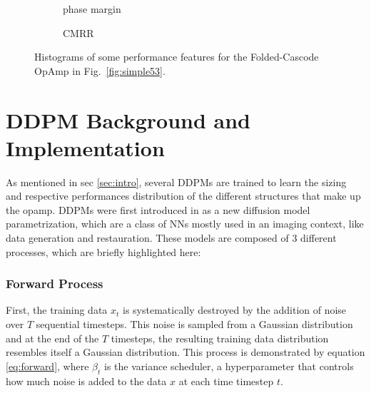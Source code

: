 \documentclass[conference]{IEEEtran}
\begin{document}
\begin{figure}[]
\begin{subfigure}{0.12\textwidth}
		\vspace{-1.4\baselineskip}
		\caption{{\footnotesize phase margin}}
		\label{fig:53ph}
		\end{subfigure}
		\hfill
		\begin{subfigure}{0.12\textwidth}
		\vspace{-1.4\baselineskip}
		\caption{{\footnotesize CMRR}}
		\label{fig:53cmrr}
		\end{subfigure}
		\setlength{\abovecaptionskip}{4ex}%
		\setlength{\belowcaptionskip}{-4ex}%
		\caption{Histograms of some performance features for the Folded-Cascode OpAmp in Fig.~\ref{fig:simple53}.}
		\label{fig:perffeatures53}
		\end{figure}
	
\section{DDPM Background and Implementation}\label{sec:ddpm}
	As mentioned in sec \ref{sec:intro}, several DDPMs are trained to learn the sizing and respective performances distribution of the different structures that make up the opamp. DDPMs were first introduced in \cite{ho2020denoisingdiffusionprobabilisticmodels} as a new diffusion model parametrization, which are a class of NNs mostly used in an imaging context, like data generation and restauration. These models are composed of 3 different processes, which are briefly highlighted here:
	
	\subsubsection{Forward Process}
	First, the training data $x_{t}$ is systematically destroyed by the addition of noise over $T$ sequential timesteps. This noise is sampled from a Gaussian distribution and at the end of the $T$ timesteps, the resulting training data distribution resembles itself a Gaussian distribution. This process is demonstrated by equation \ref{eq:forward}, where $\beta_{t}$ is the variance scheduler, a hyperparameter that controls how much noise is added to the data $x$ at each time timestep $t$.
	
\end{document}
